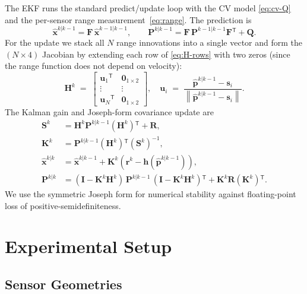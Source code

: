 \documentclass[11pt,a4paper]{article}
\newcommand{\norm}[1]{\left\lVert #1 \right\rVert}
\newcommand{\transpose}{{}^{\mathsf{T}}}
\begin{document}
The EKF runs the standard predict/update loop with the CV model
\eqref{eq:cv-Q} and the per-sensor range measurement~\eqref{eq:range}.  The
prediction is
\begin{equation}
  \hat{\mathbf{x}}^{k|k-1} = \mathbf{F}\, \hat{\mathbf{x}}^{k-1|k-1},
  \qquad
  \mathbf{P}^{k|k-1} = \mathbf{F}\,\mathbf{P}^{k-1|k-1} \mathbf{F}\transpose + \mathbf{Q}.
\end{equation}
For the update we stack all $N$ range innovations into a single vector and
form the $(N\times 4)$ Jacobian by extending each row of \eqref{eq:H-rows}
with two zeros (since the range function does not depend on velocity):
\begin{equation}
  \mathbf{H}^k \;=\;
  \begin{bmatrix}
    \mathbf{u}_1\transpose & \mathbf{0}_{1\times 2} \\
    \vdots & \vdots \\
    \mathbf{u}_N\transpose & \mathbf{0}_{1\times 2}
  \end{bmatrix},
  \quad
  \mathbf{u}_i \;=\; \frac{\hat{\mathbf{p}}^{k|k-1} - \mathbf{s}_i}
                          {\norm{\hat{\mathbf{p}}^{k|k-1} - \mathbf{s}_i}}.
\end{equation}
The Kalman gain and Joseph-form covariance update are
\begin{align}
  \mathbf{S}^k &= \mathbf{H}^k \mathbf{P}^{k|k-1} (\mathbf{H}^k)\transpose + \mathbf{R}, \\
  \mathbf{K}^k &= \mathbf{P}^{k|k-1} (\mathbf{H}^k)\transpose (\mathbf{S}^k)^{-1}, \\
  \hat{\mathbf{x}}^{k|k} &= \hat{\mathbf{x}}^{k|k-1} + \mathbf{K}^k (\mathbf{r}^k - \mathbf{h}(\hat{\mathbf{p}}^{k|k-1})), \\
  \mathbf{P}^{k|k} &= (\mathbf{I} - \mathbf{K}^k \mathbf{H}^k)\, \mathbf{P}^{k|k-1}\, (\mathbf{I} - \mathbf{K}^k \mathbf{H}^k)\transpose
                    + \mathbf{K}^k \mathbf{R} (\mathbf{K}^k)\transpose.
\end{align}
We use the symmetric Joseph form for numerical stability against
floating-point loss of positive-semidefiniteness.

\section{Experimental Setup}

\subsection{Sensor Geometries}
\end{document}
